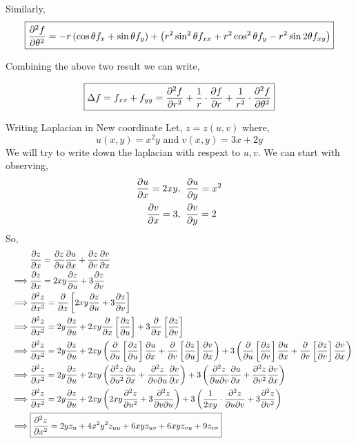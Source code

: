 \documentclass[../Analysis-3]{subfiles}
\begin{document}
Similarly, \[ \boxed{\pdv[2]{f}{\theta} = -r \left( \cos{\theta} f_x + \sin{\theta} f_y \right) + \left( r^2\sin^2 \theta f_{xx} + r^2\cos^2 \theta f_{y} - r^2\sin 2 \theta f_{xy} \right)} \]

Combining the above two result we can write, 

\[ \boxed{\Delta f = f_{xx} + f_{yy} = \pdv[2]{f}{r} + \frac{1}{r}\cdot\pdv{f}{r} + \frac{1}{r^2}\cdot\pdv[2]{f}{\theta}} \]

\begin{Eg}{Writing Laplacian in New coordinate}{}
    Let, $z = z(u,v)$ where, \[ u(x,y) = x^2y \text{ and } v(x,y) = 3x + 2y \]
    We will try to write down the laplacian with respext to $u,v$. We can start with observing, \begin{align*}
            \pdv{u}{x} = 2xy, \hspace*{0.2cm}& \pdv{u}{y} = x^2    \\
            \pdv{v}{x} = 3, \hspace*{0.2cm}   & \pdv{v}{y} = 2
        \end{align*}
So,
    \begin{align*}
        \hspace{1cm} & \pdv{z}{x} = \pdv{z}{u} \pdv{u}{x} + \pdv{z}{v} \pdv{v}{x}\\
        \implies  & \pdv{z}{x} = 2xy \pdv{z}{u} + 3 \pdv{z}{v}   \\
        \implies  & \pdv[2]{z}{x} = \pdv{}{x} \left[ 2xy \pdv{z}{u} + 3 \pdv{z}{v} \right]  \\
        \implies & \pdv[2]{z}{x} = 2y \pdv{z}{u} + 2xy \pdv{}{x} \left[\pdv{z}{u}\right]  + 3\pdv{}{x} \left[\pdv{z}{v}\right]                                        \\
        \implies & \pdv[2]{z}{x} = 2y \pdv{z}{u} + 2xy \left(\pdv{}{u} \left[\pdv{z}{u}\right] \pdv{u}{x} + \pdv{}{v} \left[\pdv{z}{u}\right] \pdv{v}{x}\right)  + 3\left( \pdv{}{u} \left[\pdv{z}{v}\right] \pdv{u}{x} + \pdv{}{v} \left[\pdv{z}{v}\right] \pdv{v}{x} \right) \\
        \implies                & \pdv[2]{z}{x} = 2y \pdv{z}{u} + 2xy \left(\pdv[2]{z}{u} \pdv{u}{x} + \pdv{z}{v}{u} \pdv{v}{x}\right)  + 3\left( \pdv{z}{u}{v} \pdv{u}{x} + \pdv[2]{z}{v} \pdv{v}{x}\right)                                                                                  \\
        \implies                & \pdv[2]{z}{x} = 2y \pdv{z}{u} + 2xy \left(2xy \pdv[2]{z}{u}  + 3 \pdv{z}{v}{u}\right)  + 3\left( \frac{1}{2xy}\cdot\pdv{z}{u}{v}  + 3\pdv[2]{z}{v}\right)                                                                                                   \\
        \implies                & \boxed{\pdv[2]{z}{x} = 2y z_u + 4x^2y^2z_{uu}+ 6xy z_{uv} + 6xy z_{vu} + 9z_{vv}}
    \end{align*}

\end{Eg}
\end{document}

